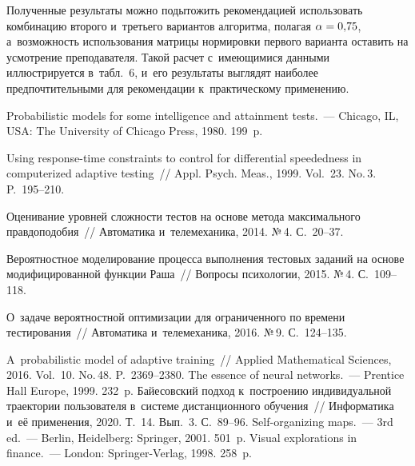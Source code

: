 \begin{multicols}{2}
\vspace*{-2pt}

     Полученные результаты можно подытожить рекомендацией 
использовать комбинацию второго и~третьего вариантов алгоритма, полагая 
$\alpha\hm= 0{,}75$, а~возможность использования матрицы нормировки 
первого варианта оставить на усмотрение преподавателя. Такой расчет 
с~имеющимися данными иллюстрируется в~табл.~6, и~его результаты выглядят 
наиболее предпочтительными для рекомендации к~практическому 
применению.
     

\vspace*{-6pt}

{\small\frenchspacing
 {%
 \begin{thebibliography}{99}
 
 \vspace*{-2pt}

 Probabilistic models for some intelligence and attainment tests.~--- Chicago, IL, USA: The 
University of Chicago Press, 1980. 199~p. 

 Using response-time 
constraints to control for differential speededness in computerized adaptive testing~// Appl. 
Psych. Meas., 1999. Vol.~23. No.\,3. P.~195--210.

 Оценивание уровней сложности тестов на основе 
метода максимального правдоподобия~// Автоматика и~телемеханика, 2014. №\,4.  
С.~20--37.

Вероятностное моделирование процесса выполнения тестовых заданий на основе 
модифицированной функции Раша~// Вопросы психологии, 2015. №\,4. С.~109--118.

 О~задаче вероятностной оптимизации для 
ограниченного по времени тестирования~// Автоматика и~телемеханика, 2016. №\,9. 
С.~124--135.

 A~probabilistic model of adaptive training~// Applied Mathematical Sciences, 
2016. Vol.~10. No.\,48. P.~2369--2380.
 The essence of neural networks.~--- Prentice Hall Europe, 1999. 232~p.
 Байесовский подход 
к~построению индивидуальной траектории пользователя в~системе дистанционного 
обучения~// Информатика и~её применения, 2020. Т.~14. Вып.~3. С.~89--96.
 Self-organizing maps.~--- 3rd ed.~--- Berlin, Heidelberg: Springer, 
2001. 501~p.
 Visual explorations in finance.~--- London: Springer-Verlag, 
1998. 258~p.


\end{thebibliography}}}
\end{multicols}

